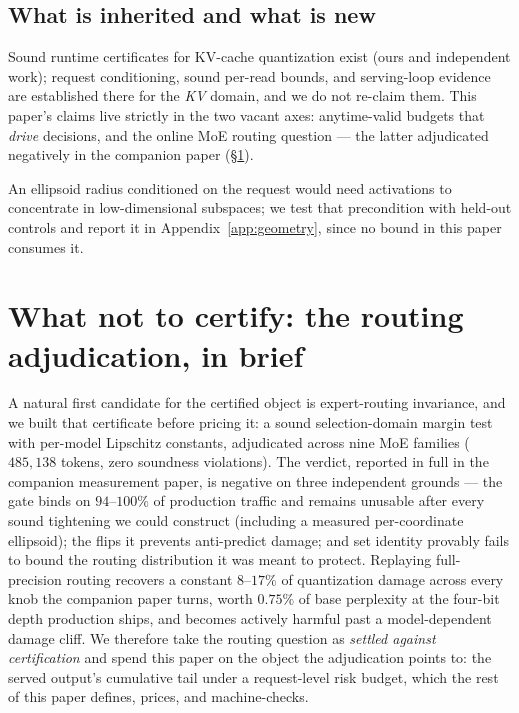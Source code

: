 \documentclass[11pt]{article}
\renewcommand{\_}{\WCorigunderscore\allowbreak}
\begin{document}
\subsection{What is inherited and what is new}
Sound runtime certificates for KV-cache quantization exist (ours and
independent work); request conditioning, sound per-read bounds, and
serving-loop evidence are established there for the \emph{KV} domain,
and we do not re-claim them. This paper's claims live strictly in the
two vacant axes: anytime-valid budgets that \emph{drive} decisions,
and the online MoE routing question --- the latter adjudicated
negatively in the companion paper (\S\ref{sec:router}).

An ellipsoid radius conditioned on the request would need activations to
concentrate in low-dimensional subspaces; we test that precondition with
held-out controls and report it in Appendix~\ref{app:geometry}, since no
bound in this paper consumes it.

\section{What not to certify: the routing adjudication, in brief}
\label{sec:router}

A natural first candidate for the certified object is expert-routing
invariance, and we built that certificate before pricing it: a sound
selection-domain margin test with per-model Lipschitz constants,
adjudicated across nine MoE families ($485{,}138$ tokens, zero
soundness violations). The verdict, reported in full in the companion
measurement paper, is negative on three independent grounds --- the
gate binds on $94$--$100\%$ of production traffic and remains unusable
after every sound tightening we could construct (including a measured
per-coordinate ellipsoid); the flips it prevents anti-predict damage;
and set identity provably fails to bound the routing distribution it
was meant to protect. Replaying full-precision routing recovers a
constant $8$--$17\%$ of quantization damage across every knob the
companion paper turns, worth $0.75\%$ of base perplexity at the
four-bit depth production ships, and becomes actively harmful past a
model-dependent damage cliff. We therefore take the routing question as
\emph{settled against certification} and spend this paper on the object
the adjudication points to: the served output's cumulative tail under a
request-level risk budget, which the rest of this paper defines, prices,
and machine-checks.
\end{document}
